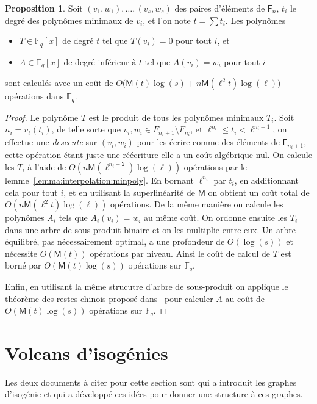 \documentclass[10pt,a4paper]{book}
\theoremstyle{plain}
\theoremstyle{definition}
\theoremstyle{definition}
\theoremstyle{definition}
\newtheorem{prop}[thm]{Proposition}
\theoremstyle{definition}
\theoremstyle{remark}
\theoremstyle{remark}
\theoremstyle{definition}
\begin{document}
\begin{prop}\label{prop:interpol}
  Soit $(v_1,w_1),\dots,(v_s,w_s)$ des paires d'éléments de $\mathsf{F}_n$, 
  $t_i$ le degré des polynômes minimaux de $v_i$, et l'on note  $t=\sum t_i$. 
  Les polynômes
  \begin{itemize}
  \item $T\in \mathbb{F}_q[x]$ de degré $t$ tel que $T(v_i)=0$ pour tout $i$,
    et
  \item $A\in \mathbb{F}_q[x]$ de degré inférieur à $t$ tel que $A(v_i)=w_i$ pour
    tout $i$
  \end{itemize}
  sont calculés avec un coût de
  $O\bigl(\mathsf{M}(t)\log(s) + n\mathsf{M}(\ell^2t)\log(\ell)\bigr)$ opérations dans $\mathbb{F}_q$.
\end{prop}
\begin{proof}
  Le polynôme $T$ est le produit de tous les polynômes minimaux $T_i$. Soit 
  $n_i=v_\ell(t_i)$, de telle sorte que $v_i,w_i\in F_{n_i+1}\setminus F_{n_i}$,
  et $\ell^{n_i}\leqslant t_i<\ell^{n_i+1}$,
  on effectue une \emph{descente} sur $(v_i,w_i)$ pour les écrire comme des 
  éléments de $\mathsf{F}_{n_i+1}$, cette opération étant juste une réécriture
  elle a un coût algébrique nul. On calcule les $T_i$ à l'aide de
   $O(n\mathsf{M}(\ell^{n_i+2})\log(\ell))$ opérations par 
   le lemme~\ref{lemma:interpolation:minpoly}. En bornant 
  $\ell^{n_i}$ par $t_i$, en additionnant cela pour tout $i$, et en utilisant 
  la superlinéarité de $\mathsf{M}$ on obtient un coût total de 
  $O(n\mathsf{M}(\ell^2t)\log(\ell))$ opérations.
  De la même manière on calcule les polynômes $A_i$ tels que $A_i(v_i)=w_i$
  au même coût.
  On ordonne ensuite les $T_i$ dans une arbre de sous-produit binaire et 
  on les multiplie entre eux. Un arbre équilibré, pas nécessairement optimal,
  a une profondeur de $O(\log (s))$ et nécessite $O(\mathsf{M}(t))$ opérations
   par niveau. Ainsi le coût de calcul de $T$ est borné par 
   $O(\mathsf{M}(t)\log(s))$ opérations sur $\mathbb{F}_q$.
  
  Enfin, en utilisant la même strucutre d'arbre de sous-produit on applique le 
  théorème des restes chinois proposé dans~\cite[Chapter~10]{vzGJG03} pour 
  calculer $A$ au coût de $O(\mathsf{M}(t)\log(s))$ opérations sur $\mathbb{F}_q$.
\end{proof}




\chapter{Volcans d'isog\'enies}
Les deux documents à citer pour cette section sont \cite{Kohel96} qui a introduit les graphes d'isogénie et   \cite{Fouquet01} qui a développé ces idées pour donner une structure à ces graphes.
\end{document}
